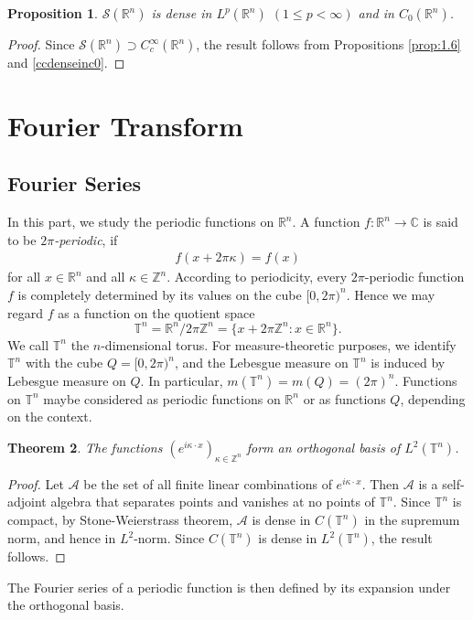 \documentclass{article}
\numberwithin{equation}{section}
\newcommand{\bbC}{\mathbb{C}}
\newcommand{\bbR}{\mathbb{R}}
\newcommand{\bbT}{\mathbb{T}}
\newcommand{\bbZ}{\mathbb{Z}}
\renewcommand{\cal}{\mathcal}
\theoremstyle{plain}
\newtheorem{theorem}{Theorem}[section]
\newtheorem{proposition}[theorem]{Proposition}
\theoremstyle{definition}
\begin{document}
\begin{proposition}
$\cal{S}(\bbR^n)$ is dense in $L^p(\bbR^n)$ $(1\leq p<\infty)$ and in $C_0(\bbR^n)$.
\end{proposition}
\begin{proof}
Since $\cal{S}(\bbR^n)\supset C^\infty_c(\bbR^n)$, the result follows from Propositions \ref{prop:1.6} and \ref{ccdenseinc0}.
\end{proof}

\newpage
\section{Fourier Transform}
\subsection{Fourier Series}
In this part, we study the periodic functions on $\bbR^n$. A function $f:\bbR^n\to\bbC$ is said to be \textit{$2\pi$-periodic}, if
\begin{align*}
	f(x+2\pi\kappa)=f(x)
\end{align*}
for all $x\in\bbR^n$ and all $\kappa\in\bbZ^n$. According to periodicity, every $2\pi$-periodic function $f$ is completely determined by its values on the cube $[0,2\pi)^n$. Hence we may regard $f$ as a function on the quotient space 
$$\bbT^n=\bbR^n/2\pi\bbZ^n=\{x+2\pi\bbZ^n:x\in\bbR^n\}.$$
We call $\bbT^n$ the $n$-dimensional torus. For measure-theoretic purposes, we identify $\bbT^n$ with the cube $Q=[0,2\pi)^n$, and the Lebesgue measure on $\bbT^n$ is induced by Lebesgue measure on $Q$. In particular, $m(\bbT^n)=m(Q)=(2\pi)^n$. Functions on $\bbT^n$ maybe considered as periodic functions on $\bbR^n$ or as functions $Q$, depending on the context.

\begin{theorem}\label{orthobasis}
The functions $(e^{i\kappa\cdot x})_{\kappa\in\bbZ^n}$ form an orthogonal basis of $L^2(\bbT^n)$.
\end{theorem}
\begin{proof}
Let $\cal{A}$ be the set of all finite linear combinations of $e^{i\kappa\cdot x}$. Then $\cal{A}$ is a self-adjoint algebra that separates points and vanishes at no points of $\bbT^n$. Since $\bbT^n$ is compact, by Stone-Weierstrass theorem, $\cal{A}$ is dense in $C(\bbT^n)$ in the supremum norm, and hence in $L^2$-norm. Since $C(\bbT^n)$ is dense in $L^2(\bbT^n)$, the result follows.
\end{proof}

The Fourier series of a periodic function is then defined by its expansion under the orthogonal basis.
\end{document}
